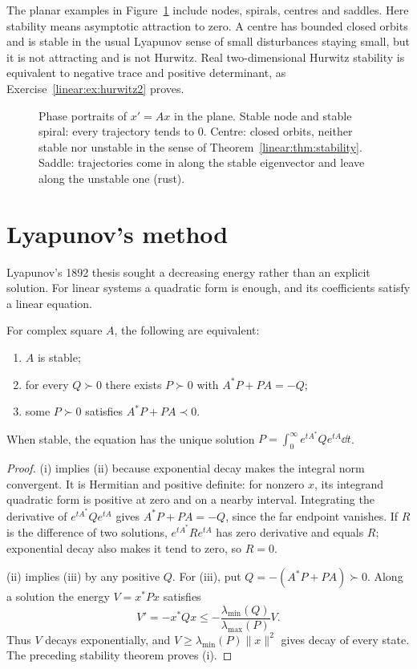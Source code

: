 The planar examples in Figure~\ref{linear:fig:phase} include nodes, spirals, centres and saddles. Here stability means asymptotic attraction to zero. A centre has bounded closed orbits and is stable in the usual Lyapunov sense of small disturbances staying small, but it is not attracting and is not Hurwitz. Real two-dimensional Hurwitz stability is equivalent to negative trace and positive determinant, as Exercise~\ref{linear:ex:hurwitz2} proves.

\begin{figure}[ht]
\centering
{}
\caption{Phase portraits of $x'=Ax$ in the plane. Stable node and stable spiral: every trajectory tends to $0$. Centre: closed
orbits, neither stable nor unstable in the sense of Theorem~\ref{linear:thm:stability}. Saddle: trajectories come in along the stable
eigenvector and leave along the unstable one (rust).}
\label{linear:fig:phase}
\end{figure}

\section{Lyapunov's method}

Lyapunov's 1892 thesis sought a decreasing energy rather than an explicit solution. For linear systems a quadratic form is enough, and its coefficients satisfy a linear equation.


\begin{theorem}[Lyapunov, 1892]\label{linear:thm:lyapunov}
For complex square $A$, the following are equivalent:
\begin{enumerate}[label=(\roman*)]
\item $A$ is stable;
\item for every $Q\succ0$ there exists $P\succ0$ with $A^*P+PA=-Q$;
\item some $P\succ0$ satisfies $A^*P+PA\prec0$.
\end{enumerate}
When stable, the equation has the unique solution $P=\int_0^\infty e^{tA^*}Qe^{tA}\dd t$.
\end{theorem}
\begin{proof}
(i) implies (ii) because exponential decay makes the integral norm convergent. It is Hermitian and positive definite: for nonzero $x$, its integrand quadratic form is positive at zero and on a nearby interval. Integrating the derivative of $e^{tA^*}Qe^{tA}$ gives $A^*P+PA=-Q$, since the far endpoint vanishes. If $R$ is the difference of two solutions, $e^{tA^*}Re^{tA}$ has zero derivative and equals $R$; exponential decay also makes it tend to zero, so $R=0$.

(ii) implies (iii) by any positive $Q$. For (iii), put $Q=-(A^*P+PA)\succ0$. Along a solution the energy $V=x^*Px$ satisfies
\[V'=-x^*Qx\le-\frac{\lambda_{\min}(Q)}{\lambda_{\max}(P)}V.
\]
Thus $V$ decays exponentially, and $V\ge\lambda_{\min}(P)\|x\|^2$ gives decay of every state. The preceding stability theorem proves (i).
\end{proof}

